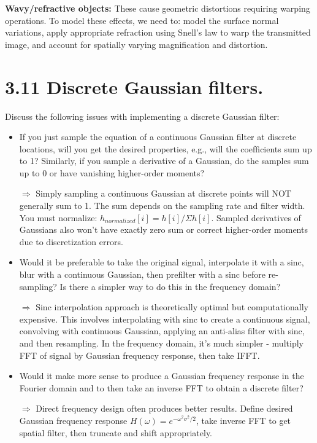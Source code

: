 \documentclass[12pt,a4paper]{article}
\begin{document}
\textbf{Wavy/refractive objects:} These cause geometric distortions requiring warping operations. To model these effects, 
we need to: model the surface normal variations, apply appropriate refraction using Snell's law to warp the transmitted image, 
and account for spatially varying magnification and distortion.

\section*{3.11 Discrete Gaussian filters.}
Discuss the following issues with implementing a discrete Gaussian filter:
\begin{itemize}
    \item If you just sample the equation of a continuous Gaussian ﬁlter at discrete locations,
will you get the desired properties, e.g., will the coefﬁcients sum up to 1? Similarly, if
you sample a derivative of a Gaussian, do the samples sum up to 0 or have vanishing
higher-order moments?

$\Rightarrow$ Simply sampling a continuous Gaussian at discrete points will NOT generally sum to 1. The sum 
depends on the sampling rate and filter width. You must normalize: $h_{normalized}[i] = h[i] / \Sigma h[i]$. Sampled derivatives 
of Gaussians also won't have exactly zero sum or correct higher-order moments due to discretization errors.

    \item Would it be preferable to take the original signal, interpolate it with a sinc, blur with a
continuous Gaussian, then preﬁlter with a sinc before re-sampling? Is there a simpler
way to do this in the frequency domain?

$\Rightarrow$ Sinc interpolation approach is theoretically optimal but computationally expensive. This involves 
interpolating with sinc to create a continuous signal, convolving with continuous Gaussian, applying an anti-alias filter with 
sinc, and then resampling. In the frequency domain, it's much simpler - multiply FFT of signal by Gaussian frequency response, 
then take IFFT.

    \item Would it make more sense to produce a Gaussian frequency response in the Fourier
domain and to then take an inverse FFT to obtain a discrete filter?

$\Rightarrow$ Direct frequency design often produces better results. Define desired Gaussian frequency response 
$H(\omega) = e^{-\omega^2\sigma^2/2}$, take inverse FFT to get spatial filter, then truncate and shift appropriately.


\end{itemize}
\end{document}
